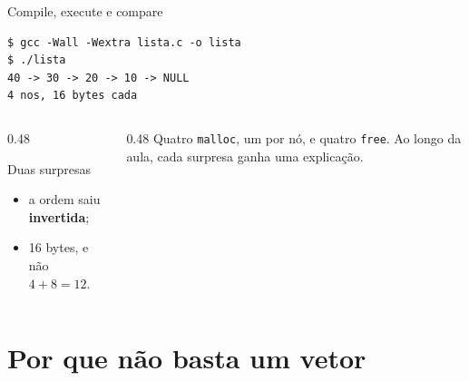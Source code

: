 \documentclass[aspectratio=169]{beamer}
\begin{document}
\begin{frame}[fragile]{Compile, execute e compare}
\begin{lstlisting}[style=shellStyle]
$ gcc -Wall -Wextra lista.c -o lista
$ ./lista
40 -> 30 -> 20 -> 10 -> NULL
4 nos, 16 bytes cada
\end{lstlisting}
  \begin{columns}[T]
    \begin{column}{0.48\textwidth}
      \begin{block}{Duas surpresas}
        \small
        \begin{itemize}
          \item a ordem saiu \textbf{invertida};
          \item 16 bytes, e não $4 + 8 = 12$.
        \end{itemize}
      \end{block}
    \end{column}
    \begin{column}{0.48\textwidth}
      \small Quatro \texttt{malloc}, um por nó, e quatro \texttt{free}. Ao
      longo da aula, cada surpresa ganha uma explicação.
    \end{column}
  \end{columns}
\end{frame}

\section{Por que não basta um vetor}
\end{document}

